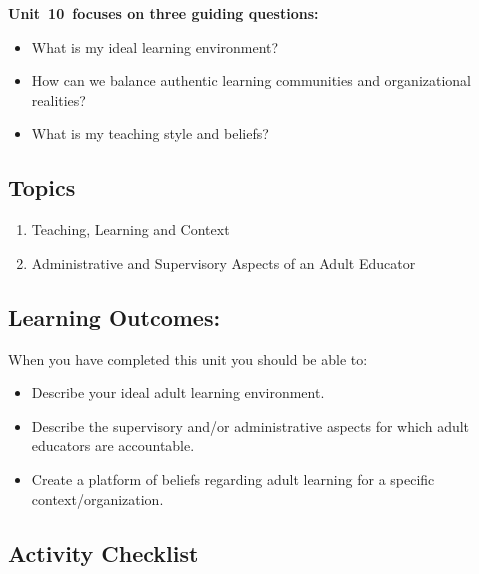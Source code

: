 \documentclass[
]{book}
\providecommand{\tightlist}{%
  \setlength{\itemsep}{0pt}\setlength{\parskip}{0pt}}
\begin{document}
\textbf{Unit~10~focuses on three guiding questions:}

\begin{itemize}
\tightlist
\item
  What is my ideal learning environment?\\
\item
  How can we balance authentic learning communities and organizational realities?\\
\item
  What is my teaching style and beliefs?
\end{itemize}

\hypertarget{topics-9}{%
\subsection*{Topics}\label{topics-9}}

\begin{enumerate}
\def\labelenumi{\arabic{enumi}.}
\tightlist
\item
  Teaching, Learning and Context\\
\item
  Administrative and Supervisory Aspects of an Adult Educator
\end{enumerate}

\hypertarget{learning-outcomes-9}{%
\subsection*{Learning Outcomes:}\label{learning-outcomes-9}}

When you have completed this unit you should be able to:

\begin{itemize}
\tightlist
\item
  Describe your ideal adult learning environment.\\
\item
  Describe the supervisory and/or administrative aspects for which adult educators are accountable.\\
\item
  Create a platform of beliefs regarding adult learning for a specific context/organization.
\end{itemize}

\hypertarget{activity-checklist-9}{%
\subsection*{Activity Checklist}\label{activity-checklist-9}}
\end{document}

